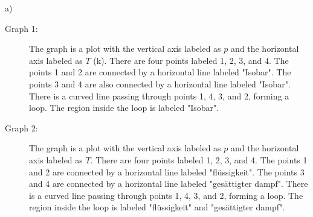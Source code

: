 a)

\begin{description}
    \item[Graph 1:] The graph is a plot with the vertical axis labeled as \( p \) and the horizontal axis labeled as \( T \) (k). There are four points labeled 1, 2, 3, and 4. The points 1 and 2 are connected by a horizontal line labeled "Isobar". The points 3 and 4 are also connected by a horizontal line labeled "Isobar". There is a curved line passing through points 1, 4, 3, and 2, forming a loop. The region inside the loop is labeled "Isobar".
\end{description}

\begin{description}
    \item[Graph 2:] The graph is a plot with the vertical axis labeled as \( p \) and the horizontal axis labeled as \( T \). There are four points labeled 1, 2, 3, and 4. The points 1 and 2 are connected by a horizontal line labeled "flüssigkeit". The points 3 and 4 are connected by a horizontal line labeled "gesättigter dampf". There is a curved line passing through points 1, 4, 3, and 2, forming a loop. The region inside the loop is labeled "flüssigkeit" and "gesättigter dampf".
\end{description}